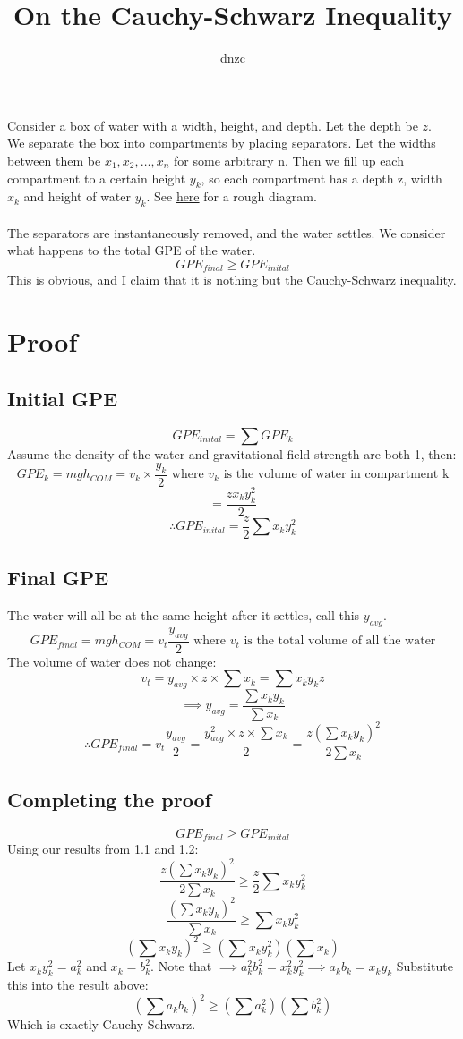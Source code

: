 \documentclass{article}
\title{On the Cauchy-Schwarz Inequality}
\author{dnzc}
\date{}
\begin{document}
\maketitle

Consider a box of water with a width, height, and depth. Let the depth be $z$.\\
We separate the box into compartments by placing separators. Let the widths between them be $x_1, x_2, \dots, x_n$ for some arbitrary n. Then we fill up each compartment to a certain height $y_k$, so each compartment has a depth z, width $x_k$ and height of water $y_k$. See \href{https://drive.google.com/file/d/1gqm9ws1wQ1Q33ZyWLfZV_EY0Je3kAVvN/view?usp=sharing}{here} for a rough diagram.\\\\

The separators are instantaneously removed, and the water settles. We consider what happens to the total GPE of the water.
\[ GPE_{final} \geq GPE_{inital}\]
This is obvious, and I claim that it is nothing but the Cauchy-Schwarz inequality.

\section{Proof}

\subsection{Initial GPE}
\[GPE_{inital} = \sum GPE_k\]
Assume the density of the water and gravitational field strength are both 1, then:
\[GPE_k = mgh_{COM} = v_k \times \frac{y_k}{2} \text{ where } v_k \text{ is the volume of water in compartment k}\]
\[ = \frac{zx_ky_k^2}{2}\]
\[\therefore GPE_{inital} = \frac{z}{2} \sum x_ky_k^2\]

\subsection{Final GPE}
The water will all be at the same height after it settles, call this $y_{avg}$.
\[GPE_{final} = mgh_{COM} = v_t \frac{y_{avg}}{2} \text{ where } v_t \text{ is the total volume of all the water}\]
The volume of water does not change:
\[v_t = y_{avg} \times z \times \sum x_k= \sum x_ky_kz\]
\[\implies y_{avg} = \frac{\sum x_ky_k}{\sum x_k}\]
\[\therefore GPE_{final} = v_t \frac{y_{avg}}{2} = \frac{y_{avg}^2 \times z \times \sum x_k}{2} = \frac{z(\sum x_ky_k)^2}{2\sum x_k}\]

\subsection{Completing the proof}
\[ GPE_{final} \geq GPE_{inital}\]
Using our results from 1.1 and 1.2:
\[\frac{z(\sum x_ky_k)^2}{2\sum x_k} \geq \frac{z}{2} \sum x_ky_k^2\]
\[\frac{(\sum x_ky_k)^2}{\sum x_k} \geq \sum x_ky_k^2\]
\[(\sum x_ky_k)^2 \geq (\sum x_ky_k^2) (\sum x_k)\]
Let $x_ky_k^2 = a_k^2$ and $x_k = b_k^2$. Note that $\implies a_k^2b_k^2 = x_k^2y_k^2 \implies a_kb_k = x_ky_k$
Substitute this into the result above:
\[(\sum a_kb_k)^2 \geq (\sum a_k^2) (\sum b_k^2)\]
Which is exactly Cauchy-Schwarz.
\end{document}

